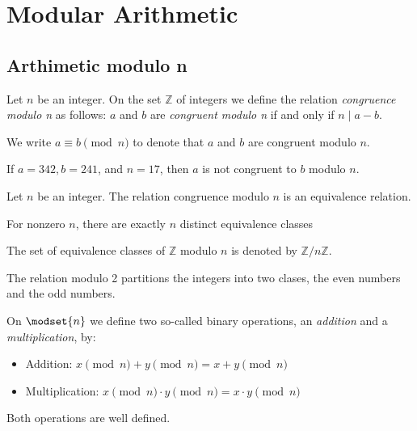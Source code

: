 \section{Modular Arithmetic}

\subsection{Arthimetic modulo n}
\begin{definition}
    Let $n$ be an integer. On the set $ \mathbb{Z} $ of integers we define
    the relation \emph{congruence modulo n} as follows: $a$ and $b$ are
    \emph{congruent modulo n} if and only if $ n \mid a - b $.

    We write $ a \equiv b \pmod{n} $ to denote that $a$ and $b$ are congruent
    modulo $n$.
\end{definition}

\begin{example}
    If $a =342, b=241$, and $n=17$, then $a$ is not congruent to $b$ modulo $n$.
\end{example}

\begin{proposition}
    Let $n$ be an integer. The relation congruence modulo $n$ is an equivalence
    relation.

    For nonzero $n$, there are exactly $n$ distinct equivalence classes

    The set of equivalence classes of $ \mathbb{Z} $ modulo $n$ is denoted
    by $ \mathbb{Z}/n\mathbb{Z} $.
\end{proposition}

\begin{example}
    The relation modulo 2 partitions the integers into two clases, the even
    numbers and the odd numbers.
\end{example}

\begin{theorem}
    On $ \modset{n} $ we define two so-called binary operations, an
    \emph{addition} and a \emph{multiplication}, by:
    \begin{itemize}
        \item Addition: $ x \pmod{n} + y \pmod{n} = x + y \pmod{n} $
        \item Multiplication: $ x \pmod{n} \cdot y \pmod{n} = x \cdot y \pmod{n} $
    \end{itemize}

    Both operations are well defined.
\end{theorem}

